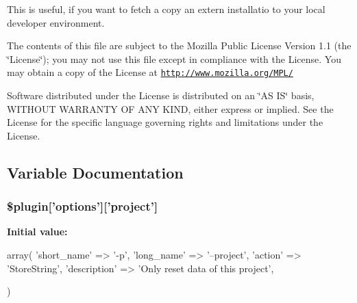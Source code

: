 This is useful, if you want to fetch a copy an extern installatio to your local developer environment.

The contents of this file are subject to the Mozilla Public License Version 1.1 (the \char`\"{}License\char`\"{}); you may not use this file except in compliance with the License. You may obtain a copy of the License at \href{http://www.mozilla.org/MPL/}{\tt http://www.mozilla.org/MPL/}

Software distributed under the License is distributed on an \char`\"{}AS IS\char`\"{} basis, WITHOUT WARRANTY OF ANY KIND, either express or implied. See the License for the specific language governing rights and limitations under the License. 

\subsection{Variable Documentation}
\hypertarget{plugin__reset-dir_8class_8php_ab3f61fdb66a7c26d551a861f8aee75c7}{
\subsubsection[{\$plugin}]{\setlength{\rightskip}{0pt plus 5cm}\$plugin\mbox{[}'options'\mbox{]}\mbox{[}'project'\mbox{]}}}
\label{plugin__reset-dir_8class_8php_ab3f61fdb66a7c26d551a861f8aee75c7}
{\bfseries Initial value:}
\begin{DoxyCode}
 array(
                              'short_name'  => '-p',
                              'long_name'   => '--project',
                              'action'      => 'StoreString',
                              'description' => 'Only reset data of this project',
      
                            )
\end{DoxyCode}
